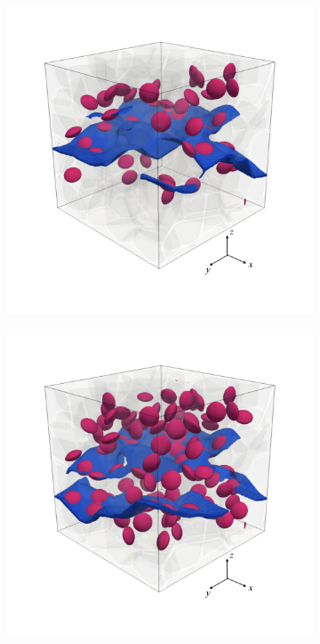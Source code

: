 \begin{frame}
  \vspace{-1.5em}
  \begin{columns}[T]
    \begin{column}{0.6\textwidth}
      \vspace{-1em}
      \begin{figure}
        \centering
        \begin{subfigure}{0.32\textwidth}
          \centering
          \includegraphics[width=\textwidth]{Chapter345/figures/b50_end}
        \end{subfigure}
        \begin{subfigure}{0.32\textwidth}
          \centering
          \includegraphics[width=\textwidth]{Chapter345/figures/b100_end}

\end{subfigure}
\end{figure}
\end{column}
\end{columns}
\end{frame}
